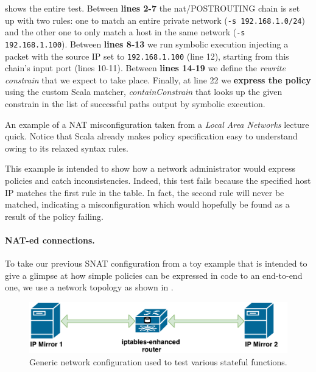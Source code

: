  shows the entire test.  Between
\textbf{lines 2-7} the nat/POSTROUTING chain is set up with two rules: one to
match an entire private network (\lstinline{-s 192.168.1.0/24}) and the other
one to only match a host in the  same network (\lstinline{-s 192.168.1.100}).
Between \textbf{lines 8-13} we run symbolic execution injecting a packet with
the source IP set to \lstinline{192.168.1.100} (line 12), starting from this
chain's input port (lines 10-11).  Between \textbf{lines 14-19} we define the
\emph{rewrite constrain} that we expect to take place.  Finally, at line 22 we
\textbf{express the policy} using the custom Scala matcher,
\emph{containConstrain} that looks up the given constrain in the list of
successful paths output by symbolic execution.

\begin{listing}[H]
  \caption{An example of a NAT misconfiguration taken from a \emph{Local Area
  Networks} lecture quick.  Notice that Scala already makes policy
  specification easy to understand owing to its relaxed syntax rules.}
  \label{lst:unreachable-rule}
\end{listing}

This example is intended to show how a network administrator would express
policies and catch inconsistencies.  Indeed, this test fails because the
specified host IP matches the first rule in the table.  In fact, the second
rule will never be matched, indicating a misconfiguration which would hopefully
be found as a result of the policy failing.

\paragraph{NAT-ed connections.}
To take our previous SNAT configuration from a toy example that is intended to
give a glimpse at how simple policies can be expressed in code to an
end-to-end one, we use a network topology as shown in
.

\begin{figure}[h]
  \centering
  \captionsetup{justification=centering}
  \includegraphics[scale=0.5]{src/img/source-nating}
  \caption{Generic network configuration used to test various stateful
  functions.}
  \label{fig:source-nating}
\end{figure}

